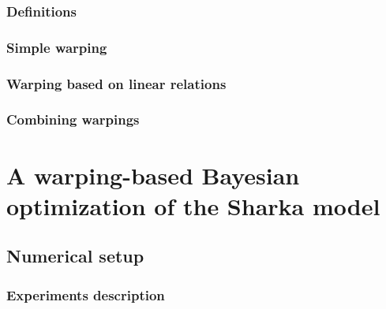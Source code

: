 \subsubsection{Definitions}

\subsubsection{Simple warping}

\subsubsection{Warping based on linear relations}

\subsubsection{Combining warpings}

% 
% 
% 

\section{A warping-based Bayesian optimization of the Sharka model}

\subsection{Numerical setup}

\subsubsection{Experiments description}


